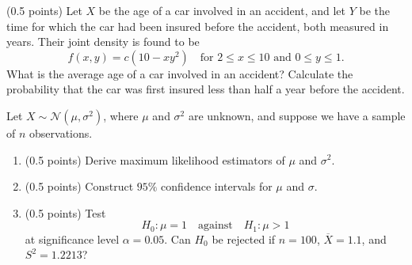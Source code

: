 \documentclass[a4paper]{report}
\begin{document}
\begin{problem}
(0.5 points) Let $X$ be the age of a car involved in an accident, and let $Y$ be the time for which the car had been insured before the accident, both measured in years. Their joint density is found to be
\[f(x,y)=c(10-xy^2)\quad\text{for }2\leq x\leq10\text{ and }0\leq y\leq1.\]
What is the average age of a car involved in an accident? Calculate the probability that the car was first insured less than half a year before the accident.
\end{problem}
\begin{problem}
Let $X\sim\mathcal N(\mu,\sigma^2)$, where $\mu$ and $\sigma^2$ are unknown, and suppose we have a sample of $n$ observations.
\begin{enumerate}
\item (0.5 points) Derive maximum likelihood estimators of $\mu$ and $\sigma^2$.
\item (0.5 points) Construct $95\%$ confidence intervals for $\mu$ and $\sigma$.
\item (0.5 points) Test
\[H_0:\mu=1\quad\text{against}\quad H_1:\mu>1\]
at significance level $\alpha=0.05$. Can $H_0$ be rejected if $n=100$, $\overline X=1.1$, and $S^2=1.2213$?
\end{enumerate}
\end{problem}
\end{document}
